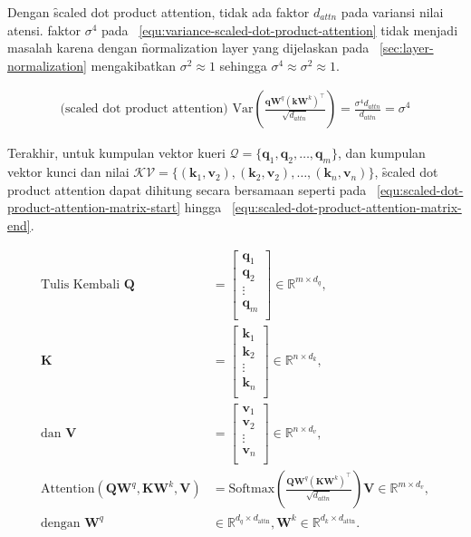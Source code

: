 	Dengan \f{scaled dot product attention}, tidak ada faktor $d_{attn}$ pada variansi nilai atensi. faktor $\sigma^4$ pada \equ~\ref{equ:variance-scaled-dot-product-attention} tidak menjadi masalah karena dengan \f{normalization layer} yang dijelaskan pada \sect~\ref{sec:layer-normalization} mengakibatkan $\sigma^2 \approx 1$ sehingga $\sigma^4 \approx \sigma^2 \approx 1$.

	\begin{align}
		\label{equ:variance-scaled-dot-product-attention}
		\text{(scaled dot product attention) }\text{Var}\left(\frac{\mathbf{qW}^q (\mathbf{kW}^k)^{\top}}{\sqrt{d_{attn}}}\right) = \frac{\sigma^4 d_{attn}}{d_{attn}} = \sigma^4
	\end{align}

	Terakhir, untuk kumpulan vektor kueri $\mathcal{Q} = \{\mathbf{q}_1, \mathbf{q}_2, \dots, \mathbf{q}_m\}$, dan kumpulan vektor kunci dan nilai $\mathcal{KV} = \{(\mathbf{k}_1, \mathbf{v}_2), (\mathbf{k}_2, \mathbf{v}_2), \dots, (\mathbf{k}_n, \mathbf{v}_n)\}$, \f{scaled dot product attention} dapat dihitung secara bersamaan seperti pada \equ~\ref{equ:scaled-dot-product-attention-matrix-start} hingga \equ~\ref{equ:scaled-dot-product-attention-matrix-end}.

	\begin{align}
	\label{equ:scaled-dot-product-attention-matrix-start}
	\text{Tulis Kembali } \mathbf{Q} &= \begin{bmatrix}
		\mathbf{q}_1 \\
		\mathbf{q}_2 \\
		\vdots \\
		\mathbf{q}_m \\
	\end{bmatrix} \in \mathbb{R}^{m \times d_{q}}, \\
	\mathbf{K} &= \begin{bmatrix}
		\mathbf{k}_1 \\
		\mathbf{k}_2 \\
		\vdots \\
		\mathbf{k}_n \\
	\end{bmatrix} \in \mathbb{R}^{n \times d_{k}}, \\
	\text{dan } \mathbf{V} &= \begin{bmatrix}
		\mathbf{v}_1 \\
		\mathbf{v}_2 \\
		\vdots \\
		\mathbf{v}_n \\
	\end{bmatrix} \in \mathbb{R}^{n \times d_{v}}, \\
	\label{equ:scaled-dot-product-attention-matrix-end}
	\text{Attention}(\mathbf{QW}^q, \mathbf{KW}^k, \mathbf{V}) &= \text{Softmax}( \frac{\mathbf{QW}^q (\mathbf{KW}^k)^{\top}}{\sqrt{d_{attn}}}) \mathbf{V} \in \mathbb{R}^{m \times d_{v}}, \\
	\text{dengan } \mathbf{W}^q &\in \mathbb{R}^{d_q \times d_{\text{attn}}}, \mathbf{W}^k \in \mathbb{R}^{d_k \times d_{\text{attn}}}.
	\end{align}

